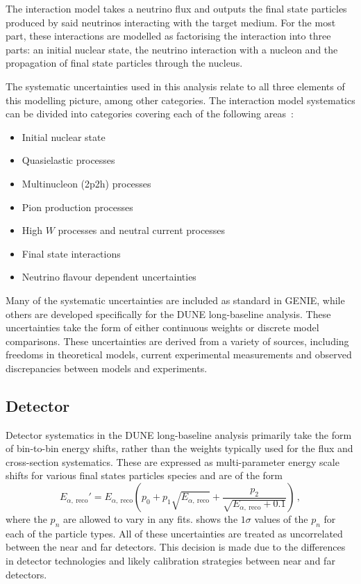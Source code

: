 The interaction model takes a neutrino flux and outputs the final state particles produced by said neutrinos interacting with the target medium.
For the most part, these interactions are modelled as factorising the interaction into three parts: an initial nuclear state, the neutrino interaction with a nucleon and the propagation of final state particles through the nucleus.

The systematic uncertainties used in this analysis relate to all three elements of this modelling picture, among other categories.
The interaction model systematics can be divided into categories covering each of the following areas~\cite{tdrVol2}: 
\begin{itemize}
	\item Initial nuclear state
	\item Quasielastic processes
	\item Multinucleon (2p2h) processes
	\item Pion production processes
	\item High $W$ processes and neutral current processes
	\item Final state interactions
	\item Neutrino flavour dependent uncertainties
\end{itemize}

Many of the systematic uncertainties are included as standard in GENIE, while others are developed specifically for the DUNE long-baseline analysis.
These uncertainties take the form of either continuous weights or discrete model comparisons.
These uncertainties are derived from a variety of sources, including freedoms in theoretical models, current experimental measurements and observed discrepancies between models and experiments.

\subsection{Detector}
\label{sec:dune_lbl:systs:det}

Detector systematics in the DUNE long-baseline analysis primarily take the form of bin-to-bin energy shifts, rather than the weights typically used for the flux and cross-section systematics.
These are expressed as multi-parameter energy scale shifts for various final states particles species and are of the form
\begin{equation}
E_{\alpha,~\text{reco}}' = E_{\alpha,~\text{reco}} \left( p_{0} + p_{1} \sqrt{E_{\alpha,~\text{reco}}} + \frac{p_{2}}{\sqrt{E_{\alpha,~\text{reco}}+0.1}} \right) \, ,
\label{eq:energyResponse}	
\end{equation}
where the $p_{n}$ are allowed to vary in any fits.
 shows the $1\sigma$ values of the $p_{n}$ for each of the particle types.
All of these uncertainties are treated as uncorrelated between the near and far detectors.
This decision is made due to the differences in detector technologies and likely calibration strategies between near and far detectors.

